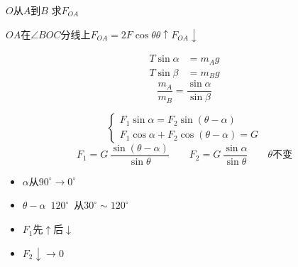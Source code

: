 \begin{problem}
$O$从$A$到$B$ 求$F_{OA}$ %
\begin{solution}
$OA$在$\angle BOC$分线上\qquad $F_{OA}=2F\cos\theta$\qquad $\theta\uparrow$\quad $F_{OA}\downarrow$
\end{solution}
\end{problem}
\begin{problem}
\begin{solution}
\begin{align*}
T\sin\alpha&=m_Ag\\
T\sin\beta&=m_Bg
\end{align*}
\[ \frac{m_A}{m_B}=\frac{\sin\alpha}{\sin\beta} \]
\end{solution}
\end{problem}
\begin{problem}[1]
\begin{solution}
\[ \begin{cases} F_1\sin\alpha=F_2\sin(\theta-\alpha)\\ F_1\cos\alpha+F_2\cos(\theta-\alpha)=G \end{cases} \]
\[ F_1=G\,\frac{\sin(\theta-\alpha)}{\sin\theta}\qquad F_2=G\,\frac{\sin\alpha}{\sin\theta}\qquad\theta\text{不变} \]
\begin{itemize}
\item $\alpha$从$90^\circ\to0^\circ$
\item $\theta-\alpha$\ $120^\circ$\ 从$30^\circ\sim120^\circ$ %
\item $F_1$先$\uparrow$后$\downarrow$
\item $F_2\downarrow\to0$
\end{itemize}
\end{solution}
\end{problem}

